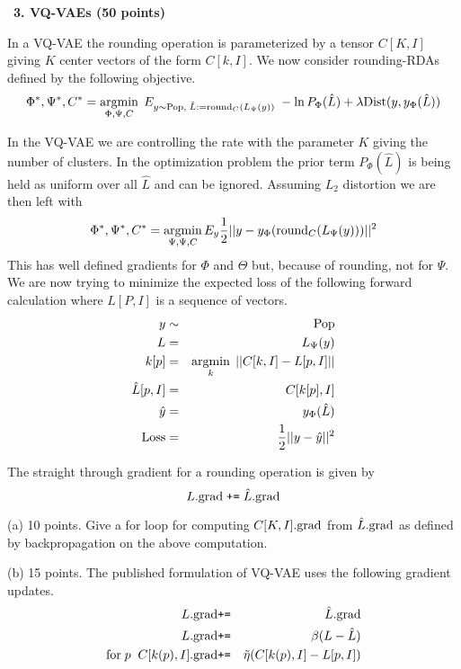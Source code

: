 \documentclass{article}
\newcommand{\solution}[1]{\bigskip {\color{red} {\bf Solution}: #1}}
\begin{document}
\bigskip
~{\bf 3. VQ-VAEs (50 points)}

In a VQ-VAE the rounding operation is parameterized by a tensor $C[K,I]$ giving $K$ center vectors of the form $C[k,I]$.
We now consider rounding-RDAs defined by the following objective.
$$\Phi^*,\Psi^*,C^* = \operatorname*{argmin}_{\Phi,\Psi,C}\;E_{y \sim \mathrm{Pop},\;\hat{L} :=\mathrm{round}_C(L_\Psi(y))}\;-\ln P_\Phi(\hat{L}) + \lambda\mathrm{Dist}(y,y_\Phi(\hat{L}))$$

In the VQ-VAE we are controlling the rate with the parameter $K$ giving the number of clusters.  In the optimization problem
the prior term $P_\Phi(\hat{L})$ is being held as uniform over all $\hat{L}$ and can be ignored.  Assuming $L_2$ distortion we are then left with
$$\Phi^*,\Psi^*,C^* = \operatorname*{argmin}_{\Psi,\Psi,C} E_y \frac{1}{2}||y - y_\Phi(\mathrm{round}_C(L_\Psi(y)))||^2$$
This has well defined gradients for $\Phi$ and $\Theta$ but, because of rounding, not for $\Psi$.
We are now trying to minimize the expected loss of the following forward calculation where $L[P,I]$ is a sequence of vectors.
\begin{eqnarray*}
  y & \sim & \mathrm{Pop} \\
  L & = & L_\Psi(y) \\
  k[p] & = & \operatorname*{argmin}_k\;||C[k,I] - L[p,I]|| \\
  \hat{L}[p,I] & = & C[k[p],I] \\
  \hat{y} & = & y_\Phi(\hat{L}) \\
  \mathrm{Loss} & = & \frac{1}{2}||y - \hat{y}||^2
\end{eqnarray*}

The straight through gradient for a rounding operation is given by
$$L.\mathrm{grad}\; \mbox{\tt +=} \; \hat{L}.\mathrm{grad}$$

(a) 10 points. Give a for loop for computing $C[K,I].\mathrm{grad}$ from $\hat{L}.\mathrm{grad}$ as defined by backpropagation on the above computation.

\solution{

  $$\mathrm{for}\;p\;\;\;C[k[p],I].\grad \;\pluseq \;\hat{L}[p,I].\grad$$
  
}

(b) 15 points. The published formulation of VQ-VAE uses the following gradient updates.
\begin{eqnarray*}
L.\mathrm{grad} & \mbox{\tt +=} & \hat{L}.\mathrm{grad} \\
L.\mathrm{grad} & \mbox{\tt +=} & \beta(L - \hat{L}) \\
\mathrm{for}\;p\;\;C[k(p),I].\mathrm{grad} & \mbox{\tt +=} & \tilde{\eta}(C[k(p),I] - L[p,I])
\end{eqnarray*}
\end{document}
